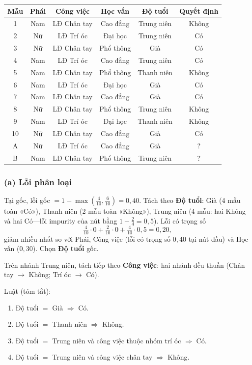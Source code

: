 \begin{center}
{\footnotesize
\begin{tabular}{@{}cccccc@{}}\toprule
Mẫu & Phái & Công việc & Học vấn & Độ tuổi & Quyết định\\\midrule
1 & Nam & LĐ Chân tay & Cao đẳng & Trung niên & Không\\
2 & Nữ & LĐ Trí óc & Đại học & Trung niên & Có\\
3 & Nữ & LĐ Chân tay & Phổ thông & Già & Có\\
4 & Nam & LĐ Trí óc & Cao đẳng & Trung niên & Có\\
5 & Nam & LĐ Chân tay & Phổ thông & Thanh niên & Không\\
6 & Nam & LĐ Trí óc & Đại học & Già & Có\\
7 & Nam & LĐ Chân tay & Cao đẳng & Già & Có\\
8 & Nữ & LĐ Chân tay & Phổ thông & Trung niên & Không\\
9 & Nam & LĐ Trí óc & Đại học & Thanh niên & Không\\
10 & Nữ & LĐ Chân tay & Cao đẳng & Già & Có\\
A & Nữ & LĐ Trí óc & Cao đẳng & Già & ?\\
B & Nam & LĐ Chân tay & Phổ thông & Trung niên & ?\\
\bottomrule
\end{tabular}
}
\end{center}

\subsubsection*{(a) Lỗi phân loại}

Tại gốc, lỗi gốc \(=1-\max(\tfrac{4}{10},\tfrac{6}{10})=0{,}40\).
Tách theo \textbf{Độ tuổi}: Già (4 mẫu toàn «Có»), Thanh niên (2 mẫu toàn «Không»), Trung niên (4 mẫu: hai Không và hai Có---lỗi impurity của nút bằng \(1-\tfrac{2}{4}=0{,}5\)). Lỗi có trọng số
\[
\tfrac{4}{10}\cdot 0+\tfrac{2}{10}\cdot 0+\tfrac{4}{10}\cdot 0{,}5=0{,}20,
\]
giảm nhiều nhất so với Phái, Công việc (lỗi có trọng số \(0{,}40\) tại nút đầu) và Học vấn (\(0{,}30\)). Chọn \textbf{Độ tuổi} gốc.

Trên nhánh Trung niên, tách tiếp theo \textbf{Công việc}: hai nhánh đều thuần (Chân tay $\to$ Không; Trí óc $\to$ Có).

Luật (tóm tắt):
\begin{enumerate}\setlength\itemsep{0pt}
  \item Độ tuổi \(=\) Già \(\Rightarrow\) Có.
  \item Độ tuổi \(=\) Thanh niên \(\Rightarrow\) Không.
  \item Độ tuổi \(=\) Trung niên và công việc thuộc nhóm trí óc \(\Rightarrow\) Có.
  \item Độ tuổi \(=\) Trung niên và công việc chân tay \(\Rightarrow\) Không.
\end{enumerate}

